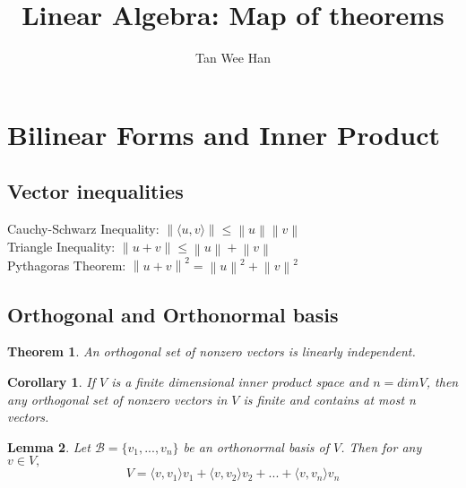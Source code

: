 \documentclass{article}
\newcommand{\norm}[1]{\left\lVert#1\right\rVert}
\newcommand{\innerproduct}[1]{\langle#1\rangle}
\newtheorem{theorem}{Theorem}[section]
\newtheorem{corollary}{Corollary}[theorem]
\newtheorem{lemma}[theorem]{Lemma}
\numberwithin{theorem}{subsection} %
\numberwithin{definition}{subsection} %
\begin{document}
\title{\Large{\textbf{Linear Algebra: Map of theorems}}}
\author{Tan Wee Han}
\maketitle

\let\cleardoublepage\clearpage
\tableofcontents

\pagestyle{plain} %

\makeatletter
\makeatother


\section{Bilinear Forms and Inner Product}


\subsection{Vector inequalities}
Cauchy-Schwarz Inequality: $\norm{\innerproduct{u,v}} \leq \norm{u}\norm{v}$ \\
Triangle Inequality: $\norm{u+v} \leq \norm{u} + \norm{v}$ \\
Pythagoras Theorem: $\norm{u+v}^2 = \norm{u}^2 + \norm{v}^2$ \bigskip

\subsection{Orthogonal and Orthonormal basis}
\begin{theorem}
    An orthogonal set of nonzero vectors is linearly independent.
\end{theorem}

\begin{corollary}
    If $V$ is a finite dimensional inner product space and $n=dim V$, then any orthogonal set of nonzero vectors in $V$ is finite and contains at most n vectors.
\end{corollary}

\begin{lemma}
    Let $ \mathcal{B} = \{v_1,...,v_n\}$ be an orthonormal basis of $V$. Then for any $v \in V,$ \\
    \begin{equation*}
        V = \innerproduct{v,v_1}v_1 + \innerproduct{v,v_2}v_2 +...+
        \innerproduct{v,v_n}v_n
    \end{equation*}
\end{lemma}
\end{document}
